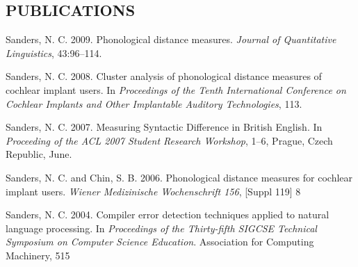 \documentclass{iuthesis}
\begin{document}
\subsection*{PUBLICATIONS}

\indent\indent Sanders, N. C. 2009. Phonological distance measures. \emph{Journal
    of Quantitative Linguistics}, 43:96--114.

  Sanders, N. C. 2008. Cluster analysis of phonological distance
  measures of cochlear implant users. In \emph{Proceedings of the
    Tenth International Conference on Cochlear Implants and Other
    Implantable Auditory Technologies}, 113.

 Sanders, N. C. 2007. Measuring Syntactic Difference in British
  English. In \emph{Proceeding of the ACL 2007 Student Research
    Workshop}, 1--6, Prague, Czech Republic, June.

  Sanders, N. C. and Chin, S. B. 2006. Phonological distance measures for cochlear implant users. \emph{Wiener Medizinische Wochenschrift 156}, [Suppl 119] 8

 Sanders, N. C.  2004. Compiler error detection techniques applied to natural language processing. In \emph{Proceedings of the Thirty-fifth SIGCSE Technical Symposium on Computer Science Education}. Association for Computing Machinery, 515



\end{document}
